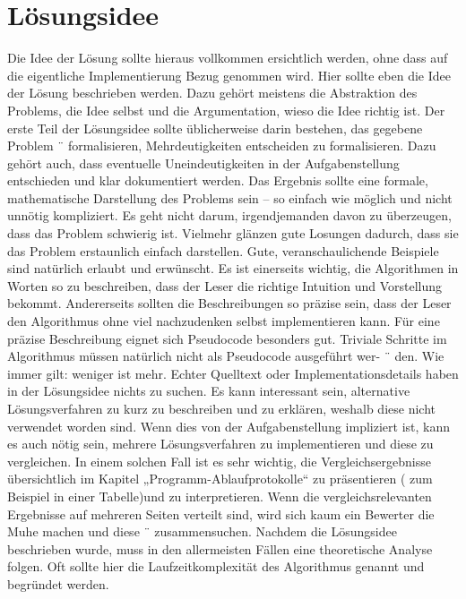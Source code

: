 \documentclass[a4paper,10pt,ngerman]{scrartcl}
\begin{document}
    \section{Lösungsidee}\label{sec:losungsidee}
    Die Idee der Lösung sollte hieraus vollkommen ersichtlich werden, ohne dass auf die eigentliche Implementierung Bezug genommen wird.
    Hier sollte eben die Idee der Lösung beschrieben werden.
    Dazu gehört meistens die Abstraktion des Problems, die Idee selbst und die Argumentation, wieso die Idee richtig ist.
    Der erste Teil der Lösungsidee sollte üblicherweise darin bestehen, das gegebene Problem ¨
    formalisieren, Mehrdeutigkeiten entscheiden zu formalisieren.
    Dazu gehört auch, dass eventuelle Uneindeutigkeiten in der Aufgabenstellung entschieden und klar dokumentiert werden.
    Das Ergebnis sollte eine formale, mathematische Darstellung des Problems sein – so einfach wie möglich und nicht unnötig kompliziert.
    Es geht nicht darum, irgendjemanden davon zu überzeugen, dass das Problem schwierig ist.
    Vielmehr glänzen gute Losungen dadurch, dass sie das Problem erstaunlich einfach darstellen.
    Gute, veranschaulichende Beispiele sind natürlich erlaubt und erwünscht.
    Es ist einerseits wichtig, die Algorithmen in Worten so zu beschreiben, dass der Leser
    die richtige Intuition und Vorstellung bekommt.
    Andererseits sollten die Beschreibungen so präzise sein, dass der Leser den Algorithmus ohne viel nachzudenken selbst implementieren kann.
    Für eine präzise Beschreibung eignet sich Pseudocode besonders gut.
    Triviale Schritte im Algorithmus müssen natürlich nicht als Pseudocode ausgeführt wer- ¨ den.
    Wie immer gilt: weniger ist mehr.
    Echter Quelltext oder Implementationsdetails
    haben in der Lösungsidee nichts zu suchen.
    Es kann interessant sein, alternative Lösungsverfahren zu kurz zu beschreiben und zu
    erklären, weshalb diese nicht verwendet worden sind.
    Wenn dies von der Aufgabenstellung impliziert ist, kann es auch nötig sein, mehrere Lösungsverfahren zu implementieren
    und diese zu vergleichen.
    In einem solchen Fall ist es sehr wichtig, die Vergleichsergebnisse übersichtlich im Kapitel „Programm-Ablaufprotokolle“ zu präsentieren
    ( zum Beispiel in einer Tabelle)und zu interpretieren.
    Wenn die vergleichsrelevanten Ergebnisse auf mehreren Seiten verteilt sind,
    wird sich kaum ein Bewerter die Muhe machen und diese ¨ zusammensuchen.
    Nachdem die Lösungsidee beschrieben wurde, muss in den allermeisten Fällen eine theoretische Analyse folgen.
    Oft sollte hier die Laufzeitkomplexität des Algorithmus genannt und begründet werden.
\end{document}
